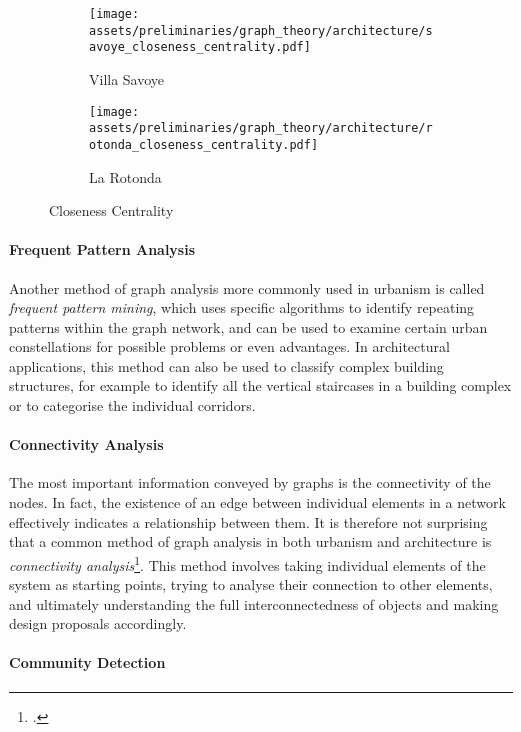 \documentclass[a4paper, 12pt]{report}
\begin{document}
\begin{figure}
\centering
\begin{subfigure}{.5\textwidth}
\centering
\texttt{[image: assets/preliminaries/graph\_theory/architecture/savoye\_closeness\_centrality.pdf]}
\caption{Villa Savoye}
\label{fig:villa-savoye-2}
\end{subfigure}%
\begin{subfigure}{.5\textwidth}
\centering
\texttt{[image: assets/preliminaries/graph\_theory/architecture/rotonda\_closeness\_centrality.pdf]}
\caption{La Rotonda}
\label{fig:la-rotonda-2}
\end{subfigure}
\caption{Closeness Centrality}
\label{fig:closeness-centrality}
\end{figure}

\paragraph{Frequent Pattern Analysis}\label{par:frequent-pattern-analysis}

Another method of graph analysis more commonly used in urbanism is called \textit{frequent pattern mining}, which uses specific algorithms to identify repeating patterns within the graph network, and can be used to examine certain urban constellations for possible problems or even advantages. In architectural applications, this method can also be used to classify complex building structures, for example to identify all the vertical staircases in a building complex or to categorise the individual corridors.

\paragraph{Connectivity Analysis}\label{par:connectivity-analysis}

The most important information conveyed by graphs is the connectivity of the nodes. In fact, the existence of an edge between individual elements in a network effectively indicates a relationship between them. It is therefore not surprising that a common method of graph analysis in both urbanism and architecture is \textit{connectivity analysis}\footcite{dawes2021examining}. This method involves taking individual elements of the system as starting points, trying to analyse their connection to other elements, and ultimately understanding the full interconnectedness of objects and making design proposals accordingly.

\paragraph{Community Detection}\label{par:community-detection}
\end{document}
